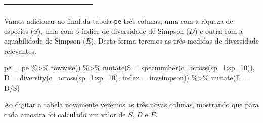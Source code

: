 \documentclass[
]{book}
\newenvironment{Shaded}{\begin{snugshade}}{\end{snugshade}}
\newcommand{\AttributeTok}[1]{\textcolor[rgb]{0.77,0.63,0.00}{#1}}
\newcommand{\FunctionTok}[1]{\textcolor[rgb]{0.00,0.00,0.00}{#1}}
\newcommand{\NormalTok}[1]{#1}
\newcommand{\OtherTok}[1]{\textcolor[rgb]{0.56,0.35,0.01}{#1}}
\newcommand{\SpecialCharTok}[1]{\textcolor[rgb]{0.00,0.00,0.00}{#1}}
\newcommand{\StringTok}[1]{\textcolor[rgb]{0.31,0.60,0.02}{#1}}
\begin{document}
\begin{tabular}{l|r|r|r|r|r|r|r|r|r|r}
\hline
\cellcolor[HTML]{e8867b}{\textcolor{black}{VERAO}} & \cellcolor[HTML]{e8867b}{\textcolor{black}{1}} & \cellcolor[HTML]{e8867b}{\textcolor{black}{0}} & \cellcolor[HTML]{e8867b}{\textcolor{black}{0}} & \cellcolor[HTML]{e8867b}{\textcolor{black}{3}} & \cellcolor[HTML]{e8867b}{\textcolor{black}{0}} & \cellcolor[HTML]{e8867b}{\textcolor{black}{2}} & \cellcolor[HTML]{e8867b}{\textcolor{black}{0}} & \cellcolor[HTML]{e8867b}{\textcolor{black}{0}} & \cellcolor[HTML]{e8867b}{\textcolor{black}{1}} & \cellcolor[HTML]{e8867b}{\textcolor{black}{0}}\\
\hline
\cellcolor[HTML]{e8867b}{\textcolor{black}{VERAO}} & \cellcolor[HTML]{e8867b}{\textcolor{black}{1}} & \cellcolor[HTML]{e8867b}{\textcolor{black}{0}} & \cellcolor[HTML]{e8867b}{\textcolor{black}{0}} & \cellcolor[HTML]{e8867b}{\textcolor{black}{0}} & \cellcolor[HTML]{e8867b}{\textcolor{black}{0}} & \cellcolor[HTML]{e8867b}{\textcolor{black}{7}} & \cellcolor[HTML]{e8867b}{\textcolor{black}{0}} & \cellcolor[HTML]{e8867b}{\textcolor{black}{0}} & \cellcolor[HTML]{e8867b}{\textcolor{black}{0}} & \cellcolor[HTML]{e8867b}{\textcolor{black}{1}}\\
\hline
\end{tabular}

Vamos adicionar ao final da tabela \texttt{pe} três colunas, uma com a riqueza de espécies (\(S\)), uma com o índice de diversidade de Simpson (\(D\)) e outra com a equabilidade de Simpson (\(E\)). Desta forma teremos as três medidas de diversidade relevantes.

\begin{Shaded}
\begin{Highlighting}[]
\NormalTok{pe }\OtherTok{=}\NormalTok{ pe }\SpecialCharTok{\%\textgreater{}\%}
  \FunctionTok{rowwise}\NormalTok{() }\SpecialCharTok{\%\textgreater{}\%} 
  \FunctionTok{mutate}\NormalTok{(}\AttributeTok{S =} \FunctionTok{specnumber}\NormalTok{(}\FunctionTok{c\_across}\NormalTok{(sp\_1}\SpecialCharTok{:}\NormalTok{sp\_10)),}
         \AttributeTok{D =} \FunctionTok{diversity}\NormalTok{(}\FunctionTok{c\_across}\NormalTok{(sp\_1}\SpecialCharTok{:}\NormalTok{sp\_10), }
                       \AttributeTok{index =} \StringTok{\textquotesingle{}invsimpson\textquotesingle{}}\NormalTok{)) }\SpecialCharTok{\%\textgreater{}\%} 
  \FunctionTok{mutate}\NormalTok{(}\AttributeTok{E =}\NormalTok{ D}\SpecialCharTok{/}\NormalTok{S)}
\end{Highlighting}
\end{Shaded}

Ao digitar a tabela novamente veremos as três novas colunas, mostrando que para cada amostra foi calculado um valor de \(S\), \(D\) e \(E\).
\end{document}
